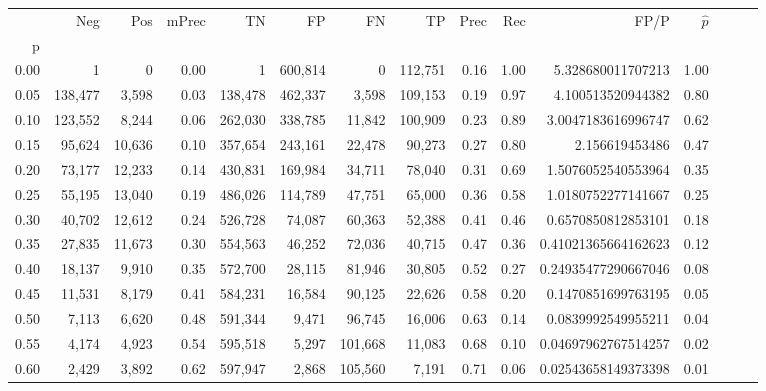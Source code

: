 \begin{tabular}{rrrrrrrrrrrrrrr}
\toprule
{} &      Neg &     Pos & mPrec &       TN &       FP &       FN &       TP &  Prec &   Rec &                    FP/P & $\hat{p}$ \\
p    &          &         &       &          &          &          &          &       &       &                         &           \\
\midrule
0.00 &        1 &       0 &  0.00 &        1 &  600,814 &        0 &  112,751 &  0.16 &  1.00 &       5.328680011707213 &      1.00 \\
0.05 &  138,477 &   3,598 &  0.03 &  138,478 &  462,337 &    3,598 &  109,153 &  0.19 &  0.97 &       4.100513520944382 &      0.80 \\
0.10 &  123,552 &   8,244 &  0.06 &  262,030 &  338,785 &   11,842 &  100,909 &  0.23 &  0.89 &      3.0047183616996747 &      0.62 \\
0.15 &   95,624 &  10,636 &  0.10 &  357,654 &  243,161 &   22,478 &   90,273 &  0.27 &  0.80 &          2.156619453486 &      0.47 \\
0.20 &   73,177 &  12,233 &  0.14 &  430,831 &  169,984 &   34,711 &   78,040 &  0.31 &  0.69 &      1.5076052540553964 &      0.35 \\
0.25 &   55,195 &  13,040 &  0.19 &  486,026 &  114,789 &   47,751 &   65,000 &  0.36 &  0.58 &      1.0180752277141667 &      0.25 \\
0.30 &   40,702 &  12,612 &  0.24 &  526,728 &   74,087 &   60,363 &   52,388 &  0.41 &  0.46 &      0.6570850812853101 &      0.18 \\
0.35 &   27,835 &  11,673 &  0.30 &  554,563 &   46,252 &   72,036 &   40,715 &  0.47 &  0.36 &     0.41021365664162623 &      0.12 \\
0.40 &   18,137 &   9,910 &  0.35 &  572,700 &   28,115 &   81,946 &   30,805 &  0.52 &  0.27 &     0.24935477290667046 &      0.08 \\
0.45 &   11,531 &   8,179 &  0.41 &  584,231 &   16,584 &   90,125 &   22,626 &  0.58 &  0.20 &      0.1470851699763195 &      0.05 \\
0.50 &    7,113 &   6,620 &  0.48 &  591,344 &    9,471 &   96,745 &   16,006 &  0.63 &  0.14 &      0.0839992549955211 &      0.04 \\
0.55 &    4,174 &   4,923 &  0.54 &  595,518 &    5,297 &  101,668 &   11,083 &  0.68 &  0.10 &     0.04697962767514257 &      0.02 \\
0.60 &    2,429 &   3,892 &  0.62 &  597,947 &    2,868 &  105,560 &    7,191 &  0.71 &  0.06 &     0.02543658149373398 &      0.01 \\

\end{tabular}
